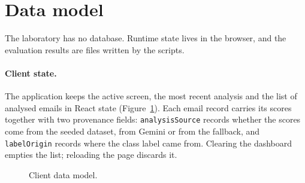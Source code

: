 \section{Data model}
\label{sec:data-model}

The laboratory has no database. Runtime state lives in the browser, and the evaluation results are files written by the scripts.

\paragraph{Client state.} The application keeps the active screen, the most recent analysis and the list of analysed emails in React state (Figure~\ref{fig:data}). Each email record carries its scores together with two provenance fields: \texttt{analysisSource} records whether the scores come from the seeded dataset, from Gemini or from the fallback, and \texttt{labelOrigin} records where the class label came from. Clearing the dashboard empties the list; reloading the page discards it.

\begin{figure}[htbp]
\centering
{}
\caption{Client data model.}
\label{fig:data}
\end{figure}

